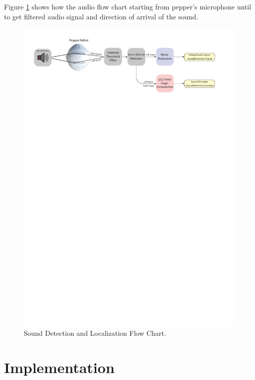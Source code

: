 \documentclass{CSSRforAfrica}
\begin{document}
\newpage

Figure \ref{fig:Sound_Diagram} shows how the audio flow chart starting from pepper's microphone until to get filtered audio signal and direction of arrival of the sound.

\begin{figure}[!hbpt]
	\centering
	\includegraphics[scale=0.78]{images/Sound_Diagram.pdf}
	\caption{Sound Detection and Localization Flow Chart.}
	\label{fig:Sound_Diagram}
\end{figure}


\newpage

\section{Implementation}
\end{document}
